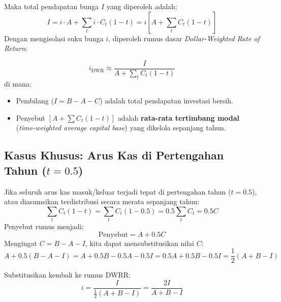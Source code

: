 \documentclass[11pt,a4paper]{article}
\begin{document}
Maka total pendapatan bunga $I$ yang diperoleh adalah:
\begin{equation}
    I = i \cdot A + \sum_t i \cdot C_t (1 - t) = i \left[ A + \sum_t C_t (1 - t) \right]
\end{equation}
Dengan mengisolasi suku bunga $i$, diperoleh rumus dasar \textit{Dollar-Weighted Rate of Return}:

\begin{definitionbox}
\begin{equation}
    i_{\text{DWR}} \approx \frac{I}{A + \sum_t C_t (1 - t)}
\end{equation}
di mana:
\begin{itemize}
    \item Pembilang ($I = B - A - C$) adalah total pendapatan investasi bersih.
    \item Penyebut $\left[ A + \sum C_t (1 - t) \right]$ adalah \textbf{rata-rata tertimbang modal} (\textit{time-weighted average capital base}) yang dikelola sepanjang tahun.
\end{itemize}
\end{definitionbox}

\subsection{Kasus Khusus: Arus Kas di Pertengahan Tahun \texorpdfstring{($t = 0.5$)}{(t = 0.5)}}

Jika seluruh arus kas masuk/keluar terjadi tepat di pertengahan tahun ($t = 0.5$), atau diasumsikan terdistribusi secara merata sepanjang tahun:
\begin{equation*}
    \sum_t C_t (1 - t) = \sum_t C_t (1 - 0.5) = 0.5 \sum_t C_t = 0.5 C
\end{equation*}
Penyebut rumus menjadi:
\begin{equation*}
    \text{Penyebut} = A + 0.5 C
\end{equation*}
Mengingat $C = B - A - I$, kita dapat mensubstitusikan nilai $C$:
\begin{equation*}
    A + 0.5(B - A - I) = A + 0.5 B - 0.5 A - 0.5 I = 0.5 A + 0.5 B - 0.5 I = \frac{1}{2}(A + B - I)
\end{equation*}

Substitusikan kembali ke rumus DWRR:
\begin{equation*}
    i = \frac{I}{\frac{1}{2}(A + B - I)} = \frac{2I}{A + B - I}
\end{equation*}
\end{document}
